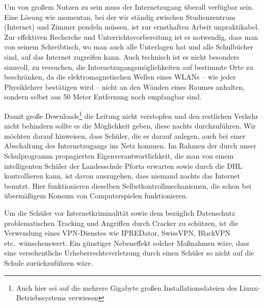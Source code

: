 \documentclass[10pt,a4paper,notitlepage]{scrartcl}
\newcommand{\gfu}{\glqq}
\begin{document}
\begin{multicols}{2}
Um von großem Nutzen zu sein muss der Internetzugang überall verfügbar sein. Eine Lösung wie momentan, bei der wir ständig zwischen Studienzentrum (\gfu Internet\grqq) und Zimmer pendeln müssen, ist zur ernsthaften Arbeit unpraktikabel. Zur effektiven Recherche und Unterrichtsvorbereitung ist es notwendig, dass man von seinem Schreibtisch, wo man auch alle Unterlagen hat und alle Schulbücher sind, auf das Internet zugreifen kann. Auch technisch ist es nicht besonders sinnvoll, zu versuchen, die Internetzugangsmöglichkeiten auf bestimmte Orte zu beschränken, da die elektromagnetischen Wellen eines WLANs -- wie jeder Physiklehrer bestätigen wird -- nicht an den Wänden eines Raumes \gfu anhalten\grqq, sondern selbst aus 50 Meter Entfernung noch empfangbar sind.

Damit große Downloads\footnote{Auch hier sei auf die mehrere Gigabyte großen Installationsdateien des Linux-Betriebssystems verwiesen} die Leitung nicht verstopfen und den restlichen Verkehr nicht behindern sollte es die Möglichkeit geben, diese nachts durchzuführen. Wir möchten darauf hinweisen, dass Schüler, die es darauf anlegen, auch bei einer Abschaltung des Internetzugangs ins Netz kommen. Im Rahmen der durch unser Schulprogramm propagierten Eigenverantwortlichkeit, die man von einem intelligenten Schüler der Landesschule Pforta erwarten sowie durch die DHL kontrollieren kann, ist davon auszugehen, dass niemand nachts das Internet benutzt. Hier funktionieren dieselben Selbstkontrollmechanismen, die schon bei übermäßigem Konsum von Computerspielen funktionieren.

Um die Schüler vor Internetkriminalität sowie dem bezüglich Datenschutz problematischen Tracking und Angriffen durch Cracker zu schützen, ist die Verwendung eines VPN-Dienstes wie IPREDator, SwissVPN, BlackVPN etc.\ wünschenswert. Ein günstiger Nebeneffekt solcher Maßnahmen wäre, dass eine versehentliche Urheberrechtsverletzung durch einen Schüler so nicht auf die Schule zurückzuführen wäre.
\end{multicols}




%
\end{document}
